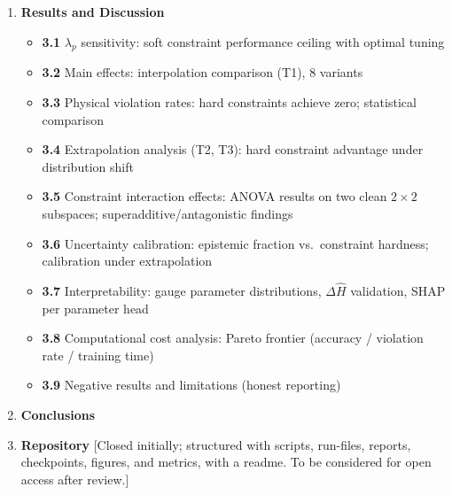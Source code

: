 \documentclass[12pt,a4paper]{article}
\begin{document}
\begin{enumerate}[label=\textbf{\arabic*.}]
\item \textbf{Results and Discussion}
\begin{itemize}
  \item \textbf{3.1} $\lambda_p$ sensitivity: soft constraint performance
    ceiling with optimal tuning
  \item \textbf{3.2} Main effects: interpolation comparison (T1), 8 variants
  \item \textbf{3.3} Physical violation rates: hard constraints achieve
    zero; statistical comparison
  \item \textbf{3.4} Extrapolation analysis (T2, T3): hard constraint
    advantage under distribution shift
  \item \textbf{3.5} Constraint interaction effects: ANOVA results on
    two clean $2\times2$ subspaces; superadditive/antagonistic findings
  \item \textbf{3.6} Uncertainty calibration: epistemic fraction vs.\
    constraint hardness; calibration under extrapolation
  \item \textbf{3.7} Interpretability: gauge parameter distributions,
    $\Delta\hat{H}$ validation, SHAP per parameter head
  \item \textbf{3.8} Computational cost analysis: Pareto frontier
    (accuracy / violation rate / training time)
  \item \textbf{3.9} Negative results and limitations (honest reporting)
\end{itemize}

\item \textbf{Conclusions}

\item \textbf{Repository} [Closed initially; structured with scripts,
run-files, reports, checkpoints, figures, and metrics, with a readme.
To be considered for open access after review.]

\end{enumerate}
\end{document}

